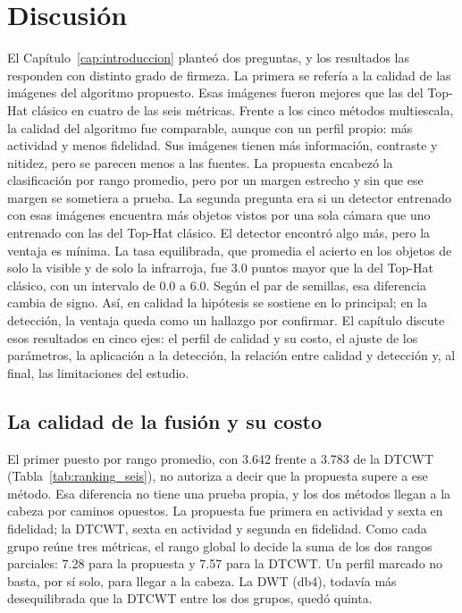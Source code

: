 \chapter{Discusión}
\label{cap:discusion}

El Capítulo~\ref{cap:introduccion} planteó dos preguntas, y los resultados las responden con distinto grado
de firmeza. La primera se refería a la calidad de las imágenes del algoritmo propuesto. Esas imágenes
fueron mejores que las del Top-Hat clásico en cuatro de las seis métricas. Frente a los cinco métodos
multiescala, la calidad del algoritmo fue comparable, aunque con un perfil propio: más actividad y menos
fidelidad. Sus imágenes tienen más información, contraste y nitidez, pero se parecen menos a las
fuentes. La propuesta encabezó la clasificación por rango promedio, pero por un margen estrecho y sin
que ese margen se sometiera a prueba. La segunda pregunta era si un detector entrenado con esas imágenes
encuentra más objetos vistos por una sola cámara que uno entrenado con las del Top-Hat clásico. El
detector encontró algo más, pero la ventaja es mínima. La tasa equilibrada, que promedia el acierto en
los objetos de solo la visible y de solo la infrarroja, fue 3.0 puntos mayor que la del Top-Hat
clásico, con un intervalo de 0.0 a 6.0. Según el par de semillas, esa diferencia cambia de signo. Así,
en calidad la hipótesis se sostiene en lo principal; en la detección, la ventaja queda como un hallazgo
por confirmar. El capítulo discute esos
resultados en cinco ejes: el perfil de calidad y su costo, el ajuste de los parámetros, la aplicación a
la detección, la relación entre calidad y detección y, al final, las limitaciones del estudio.

\section{La calidad de la fusión y su costo}
\label{sec:disc-calidad}

El primer puesto por rango promedio, con 3.642 frente a 3.783 de la DTCWT (Tabla~\ref{tab:ranking_seis}),
no autoriza a decir que la propuesta supere a ese método. Esa diferencia no tiene una prueba propia, y los
dos métodos llegan a la cabeza por caminos opuestos. La propuesta fue primera en actividad y sexta en
fidelidad; la DTCWT, sexta en actividad y segunda en fidelidad. Como cada grupo reúne tres métricas, el
rango global lo decide la suma de los dos rangos parciales: 7.28 para la propuesta y 7.57 para la DTCWT.
Un perfil marcado no basta, por sí solo, para llegar a la cabeza. La DWT (db4), todavía más
desequilibrada que la DTCWT entre los dos grupos, quedó quinta.

